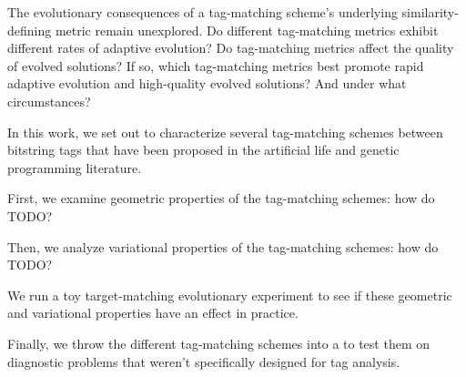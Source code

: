 The evolutionary consequences of a tag-matching scheme's underlying similarity-defining metric remain unexplored.
Do different tag-matching metrics exhibit different rates of adaptive evolution?
Do tag-matching metrics affect the quality of evolved solutions?
If so, which tag-matching metrics best promote rapid adaptive evolution and high-quality evolved solutions?
And under what circumstances?

In this work, we set out to characterize several tag-matching schemes between bitstring tags that have been proposed in the artificial life and genetic programming literature.

First, we examine geometric properties of the tag-matching schemes: how do TODO?

Then, we analyze variational properties of the tag-matching schemes: how do TODO?

We run a toy target-matching evolutionary experiment to see if these geometric and variational properties have an effect in practice.

Finally, we throw the different tag-matching schemes into a to test them on diagnostic problems that weren't specifically designed for tag analysis.
